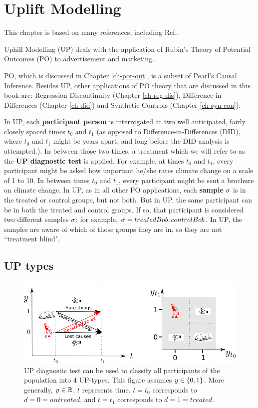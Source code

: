 \chapter{Uplift Modelling}
\label{ch-uplift}



This chapter is based 
on 
many references,
including Ref.\cite{uplift-2017, fei, wiki-uplift,jaros}.

Uphill Modelling (UP)
deals
with  the application of
Rubin's Theory of
Potential Outcomes (PO)
to advertisement and marketing.

PO, which is
discussed in Chapter \ref{ch-pot-out},
 is a subset
of Pearl's Causal Inference.
Besides UP, other  applications of PO theory
that are discussed in this book 
are: Regression Discontinuity (Chapter \ref{ch-reg-dis}),
Difference-in-Differences (Chapter \ref{ch-did})
and Synthetic Controls (Chapter \ref{ch-syn-con}).

In UP,
each {\bf participant person}
is interrogated at two well
anticipated, fairly closely spaced times
$t_0$ and $t_1$ (as opposed to 
Difference-in-Differences  (DID), where
$t_0$ and $t_1$ might
be years apart, and
long before the DID analysis is 
attempted.).
In between those two times,
a treatment which
we will refer to as the
{\bf UP diagnostic test} is applied.
For example,
at times $t_0$ and $t_1$,
every participant
might be asked
how important he/she rates climate 
change on a scale of 1 to 10.
In between times
$t_0$ and $t_1$,
every participant might
be sent a brochure on climate change.
In UP, as in all 
other PO applications, 
each {\bf sample}
$\sigma$
is in the 
treated or control
groups, but not both.
But in UP,
the same participant can be
in both the 
treated and control groups.
If so, that participant
is considered two different samples $\sigma$;
for example, $\sigma=treated Bob, control Bob$.
In UP,
the samples
are aware  of which
of those groups they are in,
so they are not ``treatment blind".

\section{UP types}

\begin{figure}[h!]
\centering
\includegraphics[width=6in]
{uplift/uplift-y-t.png}
\caption{UP diagnostic test
can be used to classify
all participants of the
population into 4 UP-types.
This figure 
assumes $y\in \{0,1\}$.
More generally, $y\in { \mathbb{R}}$.
$t$ represents time. $t=t_0$
corresponds to $d=0=untreated$,
and $t=t_1$ corresponds to $d=1=treated$.} 
\label{fig-uplift-y-t}
\end{figure}

